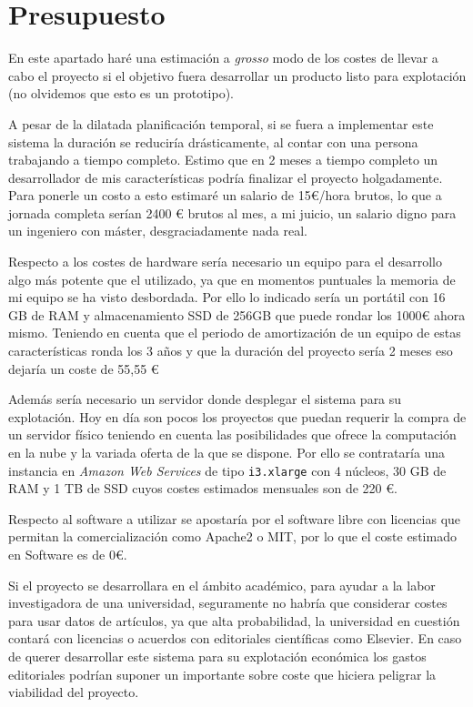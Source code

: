 \section{Presupuesto}

En este apartado haré una estimación a \textit{grosso} modo de los costes de llevar a cabo el proyecto si el objetivo fuera desarrollar un producto listo para explotación (no olvidemos que esto es un prototipo). 

A pesar de la dilatada planificación temporal, si se fuera a implementar este sistema la duración se reduciría drásticamente, al contar con una persona trabajando a tiempo completo. Estimo que en 2 meses a tiempo completo un desarrollador de mis características podría finalizar el proyecto holgadamente. Para ponerle un costo a esto estimaré un salario de 15€/hora brutos, lo que a jornada completa serían 2400 € brutos al mes, a mi juicio, un salario digno para un ingeniero con máster, desgraciadamente nada real. 

Respecto a los costes de hardware sería necesario un equipo para el desarrollo algo más potente que el utilizado, ya que en momentos puntuales la memoria de mi equipo se ha visto desbordada.
Por ello lo indicado sería un portátil con 16 GB de RAM y almacenamiento SSD de 256GB que puede rondar los 1000€ ahora mismo. Teniendo en cuenta que el periodo de amortización de un equipo de estas características ronda los 3 años y que la duración del proyecto sería 2 meses eso dejaría un coste de 55,55 €

Además sería necesario un servidor donde desplegar el sistema para su explotación. Hoy en día son pocos los proyectos que puedan requerir la compra de un servidor físico teniendo en cuenta las posibilidades que ofrece la computación en la nube y la variada oferta de la que se dispone. Por ello se contrataría una instancia en \textit{Amazon Web Services} de tipo \texttt{i3.xlarge} con 4 núcleos, 30 GB de RAM y 1 TB de SSD cuyos costes estimados mensuales son de 220 €.

Respecto al software a utilizar se apostaría por el software libre con licencias que permitan la comercialización como Apache2 o MIT, por lo que el coste estimado en Software es de 0€.

Si el proyecto se desarrollara en el ámbito académico, para ayudar a la labor investigadora de una universidad, seguramente no habría que considerar costes para usar datos de artículos, ya que alta probabilidad, la universidad en cuestión contará con licencias o acuerdos con editoriales científicas como Elsevier. En caso de querer desarrollar este sistema para su explotación económica los gastos editoriales podrían suponer un importante sobre coste que hiciera peligrar la viabilidad del proyecto.

